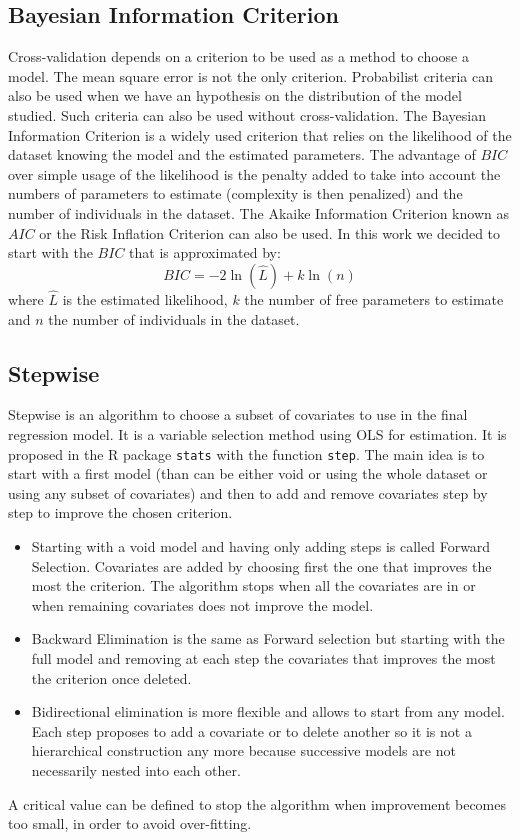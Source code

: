\documentclass[12pt,a4paper]{report}
\begin{document}
			\subsection{ Bayesian Information Criterion}
			Cross-validation depends on a criterion to be used as a method to choose a model. The mean square error is not the only criterion. Probabilist criteria can also be used when we have an hypothesis on the distribution of the model studied. Such criteria can also be used without cross-validation.
			The Bayesian Information Criterion \cite{BIChuard,schwarz1978estimating} is a widely used criterion that relies on the likelihood of the dataset knowing the model and the estimated parameters. The advantage of $BIC$ over simple usage of the likelihood is the penalty added to take into account the numbers of parameters to estimate (complexity is then penalized) and the number of individuals in the dataset. The Akaike Information Criterion \cite{akaike1974new} known as $AIC$ or the Risk Inflation Criterion \cite{foster1994risk} can also be used.
			In this work we decided to start with the $BIC$ that is approximated by:
			\begin{equation}
				BIC=-2\ln(\hat{L})+k\ln(n)
			\end{equation}
			where $\hat{L}$ is the estimated likelihood, $k$ the number of free parameters to estimate and $n$ the number of individuals in the dataset.
			\subsection{Stepwise}
			
			Stepwise \cite{seber2012linear} is an algorithm to choose a subset of covariates to use in the final regression model. It is a variable selection method using OLS for estimation. It is proposed in the R package {\tt stats} with the function {\tt step}. The main idea is to start with a first model (than can be either void or using the whole dataset or using any subset of covariates) and then to add and remove covariates step by step to improve the chosen criterion. \\
			\begin{itemize}
				\item 	Starting with a void model and having only adding steps is called Forward Selection. Covariates are added by choosing first the one that improves the most the criterion. The algorithm stops when all the covariates are in or when remaining covariates does not improve the model.
				\item Backward Elimination is the same as Forward selection but starting with the full model and removing at each step the covariates that improves the most the criterion once deleted.
				\item Bidirectional elimination is more flexible and allows to start from any model. Each step proposes to add a covariate or to delete another so it is not a hierarchical construction any more because successive models are not necessarily nested into each other.
			\end{itemize}
		A critical value can be defined to stop the algorithm when improvement becomes too small, in order to avoid over-fitting. \\
		
\end{document}
